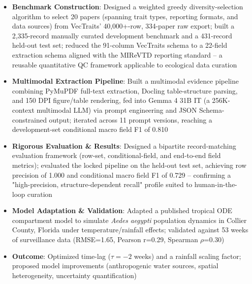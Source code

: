 \documentclass{my-resume}
\begin{document}
\begin{itemize}[parsep=0.2ex]
  \item \textbf{Benchmark Construction}: Designed a weighted greedy diversity-selection algorithm to select 20 papers (spanning trait types, reporting formats, and data sources) from VecTraits' 40,000+-row, 334-paper raw export; built a 2,335-record manually curated development benchmark and a 431-record held-out test set; reduced the 91-column VecTraits schema to a 22-field extraction schema aligned with the MIReVTD reporting standard -- a reusable quantitative QC framework applicable to ecological data curation
  \item \textbf{Multimodal Extraction Pipeline}: Built a multimodal evidence pipeline combining PyMuPDF full-text extraction, Docling table-structure parsing, and 150 DPI figure/table rendering, fed into Gemma 4 31B IT (a 256K-context multimodal LLM) via prompt engineering and JSON Schema-constrained output; iterated across 11 prompt versions, reaching a development-set conditional macro field F1 of 0.810
  \item \textbf{Rigorous Evaluation \& Results}: Designed a bipartite record-matching evaluation framework (row-set, conditional-field, and end-to-end field metrics); evaluated the locked pipeline on the held-out test set, achieving row precision of 1.000 and conditional macro field F1 of 0.729 -- confirming a "high-precision, structure-dependent recall" profile suited to human-in-the-loop curation
\end{itemize}

\begin{itemize}[parsep=0.2ex]
  \item \textbf{Model Adaptation \& Validation}: Adapted a published tropical ODE compartment model to simulate \textit{Aedes aegypti} population dynamics in Collier County, Florida under temperature/rainfall effects; validated against 53 weeks of surveillance data (RMSE=1.65, Pearson r=0.29, Spearman $\rho$=0.30)
  \item \textbf{Outcome}: Optimized time-lag ($\tau=-2$ weeks) and a rainfall scaling factor; proposed model improvements (anthropogenic water sources, spatial heterogeneity, uncertainty quantification)
\end{itemize}
\end{document}
